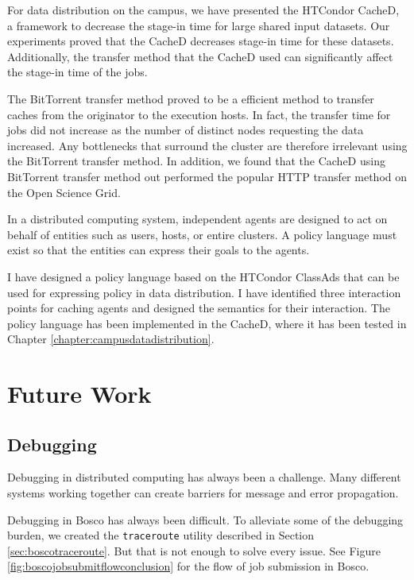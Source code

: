 For data distribution on the campus, we have presented the HTCondor CacheD, a framework to decrease the stage-in time for large shared input datasets.  Our experiments proved that the CacheD decreases stage-in time for these datasets.  Additionally, the transfer method that the CacheD used can significantly affect the stage-in time of the jobs.

The BitTorrent transfer method proved to be a efficient method to transfer caches from the originator to the execution hosts.  In fact, the transfer time for jobs did not increase as the number of distinct nodes requesting the data increased.  Any bottlenecks that surround the cluster are therefore irrelevant using the BitTorrent transfer method.  In addition, we found that the CacheD using BitTorrent transfer method out performed the popular HTTP transfer method on the Open Science Grid.

In a distributed computing system, independent agents are designed to act on behalf of entities such as users, hosts, or entire clusters.  A policy language must exist so that the entities can express their goals to the agents.  

I have designed a policy language based on the HTCondor ClassAds that can be used for expressing policy in data distribution.  I have identified three interaction points for caching agents and designed the semantics for their interaction.  The policy language has been implemented in the CacheD, where it has been tested in Chapter \ref{chapter:campusdatadistribution}. 


\section{Future Work}

\subsection{Debugging}
Debugging in distributed computing has always been a challenge.  Many different systems working together can create barriers for message and error propagation.

Debugging in Bosco has always been difficult.  To alleviate some of the debugging burden, we created the \texttt{traceroute} utility described in Section \ref{sec:boscotraceroute}.  But that is not enough to solve every issue.  See Figure \ref{fig:boscojobsubmitflowconclusion} for the flow of job submission in Bosco.

